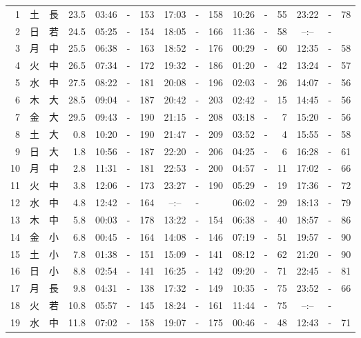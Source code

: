 \documentclass[12pt.a4j]{jsarticle}
\begin{document}
\begin{center}
\begin{table}[ht]
\begin{tabular}{|rc|cr|ccrccr|ccrccr|}
 \hline
 1 & 土 & 長 & 23.5 &  03:46 &-& 153  &  17:03 &-& 158  &   10:26 &-&  55  &   23:22 &-&  78  \\
 2 & 日 & 若 & 24.5 &  05:25 &-& 154  &  18:05 &-& 166  &   11:36 &-&  58  &   --:-- &-&     \\
 3 & 月 & 中 & 25.5 &  06:38 &-& 163  &  18:52 &-& 176  &   00:29 &-&  60  &   12:35 &-&  58  \\
 4 & 火 & 中 & 26.5 &  07:34 &-& 172  &  19:32 &-& 186  &   01:20 &-&  42  &   13:24 &-&  57  \\
 5 & 水 & 中 & 27.5 &  08:22 &-& 181  &  20:08 &-& 196  &   02:03 &-&  26  &   14:07 &-&  56  \\
 6 & 木 & 大 & 28.5 &  09:04 &-& 187  &  20:42 &-& 203  &   02:42 &-&  15  &   14:45 &-&  56  \\
 7 & 金 & 大 & 29.5 &  09:43 &-& 190  &  21:15 &-& 208  &   03:18 &-&   7  &   15:20 &-&  56  \\
 8 & 土 & 大 &  0.8 &  10:20 &-& 190  &  21:47 &-& 209  &   03:52 &-&   4  &   15:55 &-&  58  \\
 9 & 日 & 大 &  1.8 &  10:56 &-& 187  &  22:20 &-& 206  &   04:25 &-&   6  &   16:28 &-&  61  \\
10 & 月 & 中 &  2.8 &  11:31 &-& 181  &  22:53 &-& 200  &   04:57 &-&  11  &   17:02 &-&  66  \\
11 & 火 & 中 &  3.8 &  12:06 &-& 173  &  23:27 &-& 190  &   05:29 &-&  19  &   17:36 &-&  72  \\
12 & 水 & 中 &  4.8 &  12:42 &-& 164  &  --:-- &-&     &   06:02 &-&  29  &   18:13 &-&  79  \\
13 & 木 & 中 &  5.8 &  00:03 &-& 178  &  13:22 &-& 154  &   06:38 &-&  40  &   18:57 &-&  86  \\
14 & 金 & 小 &  6.8 &  00:45 &-& 164  &  14:08 &-& 146  &   07:19 &-&  51  &   19:57 &-&  90  \\
15 & 土 & 小 &  7.8 &  01:38 &-& 151  &  15:09 &-& 141  &   08:12 &-&  62  &   21:20 &-&  90  \\
16 & 日 & 小 &  8.8 &  02:54 &-& 141  &  16:25 &-& 142  &   09:20 &-&  71  &   22:45 &-&  81  \\
17 & 月 & 長 &  9.8 &  04:31 &-& 138  &  17:32 &-& 149  &   10:35 &-&  75  &   23:52 &-&  66  \\
18 & 火 & 若 & 10.8 &  05:57 &-& 145  &  18:24 &-& 161  &   11:44 &-&  75  &   --:-- &-&     \\
19 & 水 & 中 & 11.8 &  07:02 &-& 158  &  19:07 &-& 175  &   00:46 &-&  48  &   12:43 &-&  71  \\

\end{tabular}
\end{table}
\end{center}
\end{document}
